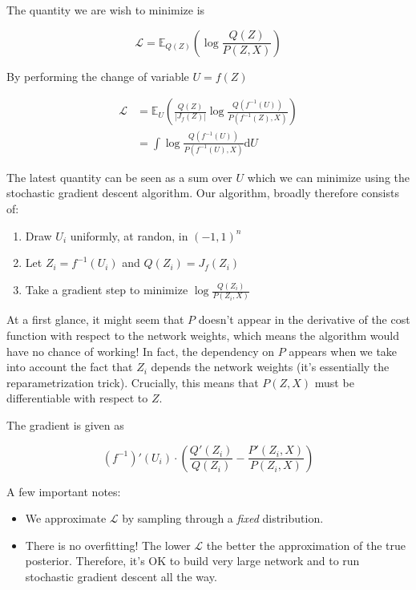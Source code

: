 \documentclass{article}
\begin{document}
The quantity we are wish to minimize is

\[
  \mathcal{L} = \mathbb{E}_{Q(Z)} \left(\log \frac{Q(Z)}{P(Z,X)} \right)
\]

By performing the change of variable $U = f(Z)$

\[
  \begin{aligned}
    \mathcal{L} &= \mathbb{E}_{U} \left(\frac{Q(Z)}{|J_{f}(Z)|}
      \log \frac{Q(f^{-1}(U))}{P(f^{-1}(Z),X)}\right)\\
                &= \int \log \frac{Q(f^{-1}(U))}{P(f^{-1}(U),X)} \mathrm{d}U
  \end{aligned}
\]

The latest quantity can be seen as a sum over $U$ which we can minimize using
the stochastic gradient descent algorithm. Our algorithm, broadly therefore
consists of:

\begin{enumerate}
\item Draw \(U_i\) uniformly, at randon, in \((-1,1)^n\)
\item Let \(Z_i = f^{-1}(U_i)\) and \(Q(Z_i) = J_f(Z_i)\)
\item Take a gradient step to minimize \(\log \frac{Q(Z_i)}{P(Z_i,X)}\)
\end{enumerate}

At a first glance, it might seem that \(P\) doesn't appear in the derivative
of the cost function with respect to the network weights, which means the
algorithm would have no chance of working! In fact, the dependency on
\(P\) appears when we take into account the fact that \(Z_i\) depends the
network weights (it's essentially the reparametrization trick).
Crucially, this means that \(P(Z,X)\) must be differentiable with respect to
\(Z\).

The gradient is given as

\[
  (f^{-1})'(U_i)\cdot\left(\frac{Q'(Z_i)}{Q(Z_i)} - \frac{P'(Z_i, X)}{P(Z_i, X)}\right)
\]

A few important notes:

\begin{itemize}
\item We approximate \(\mathcal{L}\) by sampling through a \emph{fixed} distribution.
\item There is no overfitting! The lower \(\mathcal{L}\) the better the approximation
  of the true posterior. Therefore, it's OK to build very large network and to run
  stochastic gradient descent all the way.
\end{itemize}
\end{document}
